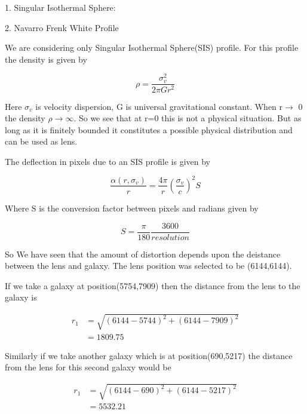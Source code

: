 1. Singular Isothermal Sphere:

2. Navarro Frenk White Profile

We are considering only Singular Isothermal Sphere(SIS) profile. For this profile the density is given by

\begin{equation}
 \rho = \frac{\sigma^2_v}{2 \pi Gr^2}
\end{equation}

Here $\sigma_v$ is velocity dispersion, G is universal gravitational constant. When r$\rightarrow$ 0 the density $\rho \rightarrow \infty $.
So we see that at r=0 this is not a physical situation. But as long as it is finitely bounded it constitutes a possible physical distribution and can be used as lens.

The deflection in pixels due to an SIS profile is given by

\begin{equation}
 \frac{\alpha(r, \sigma_v) }{r} = \frac{4\pi}{r} (\frac{\sigma_v}{c})^2 S
\end{equation}

Where S is the conversion factor between pixels and radians given by

\begin{equation}
S = \frac{\pi}{180} \frac{3600}{resolution}
\end{equation}

So We have seen that the amount of distortion depends upon the deistance between the lens and galaxy. The lens position was selected
to be (6144,6144).

If we take a galaxy at position(5754,7909) then the distance from the lens to the galaxy is

\begin{equation}
\begin{split}
 r_1 &= \sqrt{(6144-5744)^2 + (6144-7909)^2} \\
     &= 1809.75
 \end{split}
\end{equation}


Similarly if we take another galaxy which is at position(690,5217) the distance from the lens for this second galaxy would be

\begin{equation}
\begin{split}
 r_1 &= \sqrt{(6144-690)^2 + (6144-5217)^2} \\
     &= 5532.21
 \end{split}
\end{equation}

